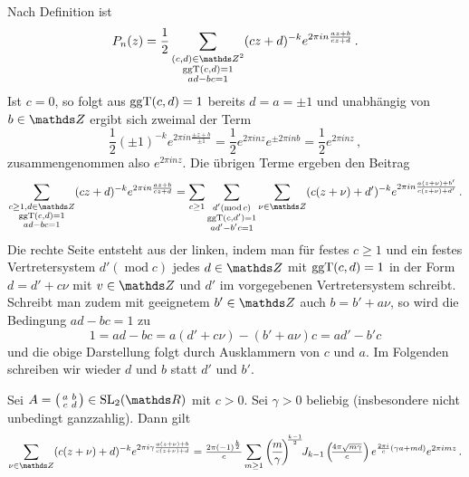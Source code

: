 \begin{bewe}
Nach Definition ist 
\[
	P_n(z) = \frac 12 \sum_{\substack{(c,d)\in\ZZ^2 \\ \ggt(c,d) = 1 \\ ad-bc = 1}} (cz+d)^{-k} e^{2\pi in \frac{az+b}{cz+d}}
	\,.
\]
Ist $c = 0$, so folgt aus $\operatorname{ggT}(c,d) = 1$ bereits $d = a = \pm 1$ und unabhängig von $b \in \ZZ$ ergibt sich zweimal der Term
\[
	\frac 12 (\pm 1)^{-k} e^{2\pi in \frac{\pm z + b}{\pm 1}} = \frac 12 e^{2\pi in z} e^{\pm 2\pi in b} = \frac 12 e^{2 \pi inz}
	\,,
\]
zusammengenommen also $e^{2 \pi inz}$. Die übrigen Terme ergeben den Beitrag 
\[
	\sum_{\substack{c \geq 1, d \in \ZZ \\ \ggt(c,d) = 1 \\ ad-bc = 1}} (cz+d)^{-k} e^{2 \pi i n \frac{az+b}{cz+d}} = \sum_{c \geq 1} \sum_{\substack{d' (\operatorname{mod} c) \\ \ggt(c,d') = 1 \\ ad'-b'c = 1}} \sum_{\nu \in \ZZ} (c(z + \nu) +d')^{-k} e^{2\pi in \frac{a(z+\nu)+b'}{c(z+\nu)+d'}}
	\,.
\]
Die rechte Seite entsteht aus der linken, indem man für festes $c \geq 1$ und ein festes Vertretersystem $d' (\operatorname{mod} c)$ jedes $d \in \ZZ$ mit $\operatorname{ggT}(c,d) = 1$ in der Form $d = d' + c\nu$ mit $v \in \ZZ$ und $d'$ im vorgegebenen Vertretersystem schreibt. Schreibt man zudem mit geeignetem $b' \in \ZZ$ auch $b = b' + a\nu$, so wird die Bedingung $ad - bc = 1$ zu
\[
	1 = ad - bc = a(d' + c\nu) - (b' + a\nu)c = ad' - b'c
\]
und die obige Darstellung folgt durch Ausklammern von $c$ und $a$. Im Folgenden schreiben wir wieder $d$ und $b$ statt $d'$ und $b'$.

\begin{lemm}
Sei $A = \mymat abcd \in \SL_2(\RR)$ mit $c > 0$. Sei $\gamma > 0$ beliebig (insbesondere nicht unbedingt ganzzahlig). Dann gilt
\[
	\sum_{\nu \in \ZZ} (c(z + \nu) +d)^{-k} e^{2\pi i\gamma \frac{a(z+\nu)+b}{c(z+\nu)+d}} 
	= 
	\tfrac{2\pi (-1)^{\frac k2}}c \sum_{m \geq 1} \left(\!\frac m\gamma\!\right)^{\!\!\frac{k-1}2} \!\! J_{k-1}\left(\!\tfrac{4\pi\sqrt{m\gamma}}c\right) e^{\frac{2\pi i}c (\gamma a + md)} e^{2\pi imz}
	\,.
\]
\end{lemm}


\end{bewe}
